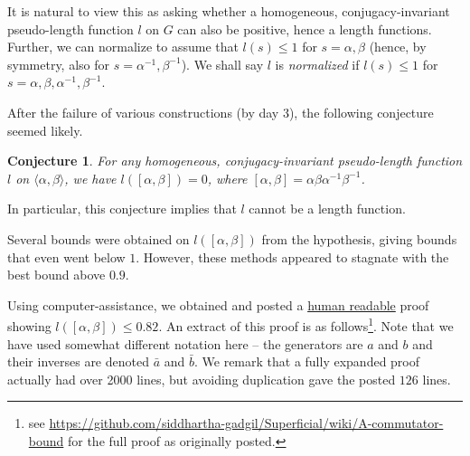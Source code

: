 \documentclass{amsart}
\theoremstyle{plain}
\newtheorem{conjecture}[theorem]{Conjecture}
\theoremstyle{definition}
\theoremstyle{remark}
\newcommand{\F}{\langle \alpha, \beta \rangle}
\begin{document}
It is natural to view this as asking whether a homogeneous, conjugacy-invariant pseudo-length function $l$ on $G$ can also be positive, hence a length functions. Further, we can normalize to assume that $l(s)\leq 1$ for $s=\alpha, \beta$ (hence, by symmetry, also for $s = \alpha^{-1}, \beta^{-1}$). We shall say $l$ is \emph{normalized} if $l(s)\leq 1$ for $s=\alpha, \beta, \alpha^{-1}, \beta^{-1}$.

After the failure of various constructions (by day $3$), the following conjecture seemed likely.

\begin{conjecture}
	For any homogeneous, conjugacy-invariant pseudo-length function $l$ on $\F$, we have $l([\alpha, \beta]) = 0$, where $[\alpha, \beta] = \alpha\beta\alpha^{-1}\beta^{-1}$.
\end{conjecture}

In particular, this conjecture implies that $l$ cannot be a length function.

Several bounds were obtained on $l([\alpha, \beta])$ from the hypothesis, giving bounds that even went below $1$. However, these methods appeared to stagnate with the best bound above $0.9$.

Using computer-assistance, we obtained and posted
 a \href{https://github.com/siddhartha-gadgil/Superficial/wiki/A-commutator-bound}{human readable} proof showing $l([\alpha, \beta]) \leq 0.82$.
 An extract of this proof is as follows\footnote{see \href{https://github.com/siddhartha-gadgil/Superficial/wiki/A-commutator-bound}{https://github.com/siddhartha-gadgil/Superficial/wiki/A-commutator-bound} for the full proof as originally posted.}. Note that we have used somewhat different notation here -- the generators are $a$ and $b$ and their inverses are denoted $\bar{a}$ and $\bar{b}$. We remark that a fully expanded proof actually had over 2000 lines, but avoiding duplication gave the posted $126$ lines.
\end{document}
